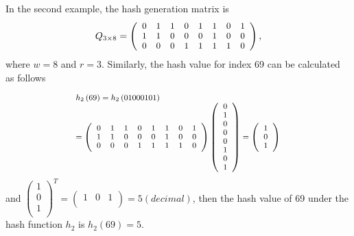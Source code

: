 \documentclass[10pt,journal,compsoc]{IEEEtran}
\begin{document}
In the second example, the hash generation matrix is
\begin{equation}
\footnotesize
{Q_{3 \times 8}} = \left( {\begin{array}{*{20}{c}}
   0 & 1 & 1 & 0 & 1 & 1 & 0 & 1  \\
   1 & 1 & 0 & 0 & 0 & 1 & 0 & 0  \\
   0 & 0 & 0 & 1 & 1 & 1 & 1 & 0  \\
\end{array}} \right),
\label{eq:h2matrix}
\end{equation}
where $w=8$ and $r=3$. Similarly, the hash value for index 69 can be calculated as follows

\begin{equation}
\scriptsize
\begin{array}{l}
 {h_2}\left( {69} \right) = h_2\left( {{\rm{01000101}}} \right) \\
  = \left( {\begin{array}{*{20}{c}}
   0 & 1 & 1 & 0 & 1 & 1 & 0 & 1  \\
   1 & 1 & 0 & 0 & 0 & 1 & 0 & 0  \\
   0 & 0 & 0 & 1 & 1 & 1 & 1 & 0  \\
\end{array}} \right)\left( {\begin{array}{*{20}{c}}
   0  \\
   1  \\
   0  \\
   0  \\
   0  \\
   1  \\
   0  \\
   1  \\
\end{array}} \right) = \left( {\begin{array}{*{20}{c}}
   1  \\
   0  \\
   1  \\
\end{array}} \right) \\
 \end{array}
\label{eq:h3example2}
\end{equation}
\noindent and ${\left( {\begin{array}{*{20}{c}}
   1  \\
   0 \\
   1  \\
\end{array}} \right)^T} = \left( {\begin{array}{*{20}{c}}
   1 & 0 & 1  \\
\end{array}} \right) = 5\left( decimal \right)$, then the hash value of 69 under the hash function $h_2$ is $h_2(69)=5$.
\end{document}
